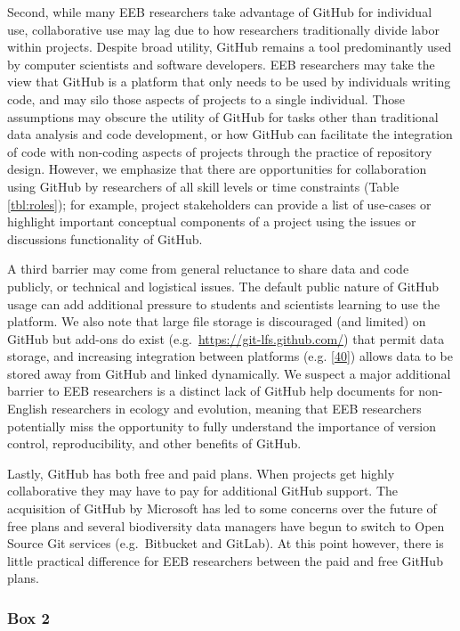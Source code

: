 Second, while many EEB researchers take advantage of GitHub for individual use, collaborative use may lag due to how researchers traditionally divide labor within projects.
Despite broad utility, GitHub remains a tool predominantly used by computer scientists and software developers.
EEB researchers may take the view that GitHub is a platform that only needs to be used by individuals writing code, and may silo those aspects of projects to a single individual.
Those assumptions may obscure the utility of GitHub for tasks other than traditional data analysis and code development, or how GitHub can facilitate the integration of code with non-coding aspects of projects through the practice of repository design.
However, we emphasize that there are opportunities for collaboration using GitHub by researchers of all skill levels or time constraints (Table \ref{tbl:roles}); for example, project stakeholders can provide a list of use-cases or highlight important conceptual components of a project using the issues or discussions functionality of GitHub.

A third barrier may come from general reluctance to share data and code publicly, or technical and logistical issues.
The default public nature of GitHub usage can add additional pressure to students and scientists learning to use the platform.
We also note that large file storage is discouraged (and limited) on GitHub but add-ons do exist (e.g.~\url{https://git-lfs.github.com/}) that permit data storage, and increasing integration between platforms (e.g. {[}\protect\hyperlink{ref-lx49NGto}{40}{]}) allows data to be stored away from GitHub and linked dynamically.
We suspect a major additional barrier to EEB researchers is a distinct lack of GitHub help documents for non-English researchers in ecology and evolution, meaning that EEB researchers potentially miss the opportunity to fully understand the importance of version control, reproducibility, and other benefits of GitHub.

Lastly, GitHub has both free and paid plans.
When projects get highly collaborative they may have to pay for additional GitHub support.
The acquisition of GitHub by Microsoft has led to some concerns over the future of free plans and several biodiversity data managers have begun to switch to Open Source Git services (e.g.~Bitbucket and GitLab).
At this point however, there is little practical difference for EEB researchers between the paid and free GitHub plans.

\hypertarget{tips}{%
\subsubsection{Box 2}\label{tips}}

